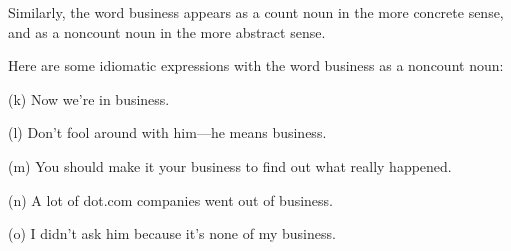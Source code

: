 \documentclass{article}
\begin{document}
Similarly, the word business appears as a count noun in the more concrete sense, and as a noncount noun in the more abstract sense.

Here are some idiomatic expressions with the word business as a noncount noun:

(k) Now we're in business.

(l) Don't fool around with him—he means business.

(m) You should make it your business to find out what really happened.

(n) A lot of dot.com companies went out of business.

(o) I didn't ask him because it's none of my business.
\end{document}
